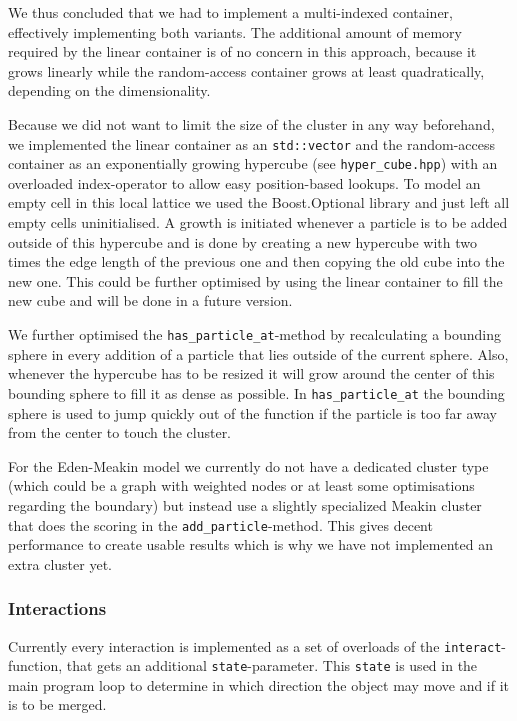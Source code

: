 \documentclass[twocolumn, 10pt]{scrartcl}
\begin{document}
                We thus concluded that we had to implement a multi-indexed container, effectively implementing both
                variants. The additional amount of memory required by the linear container is of no concern in this
                approach, because it grows linearly while the random-access container grows at least quadratically,
                depending on the dimensionality.

                Because we did not want to limit the size of the cluster in any way beforehand, we implemented the linear
                container as an \lstinline'std::vector' and the random-access container as an exponentially growing
                hypercube (see \lstinline'hyper_cube.hpp') with an overloaded index-operator to allow easy
                position-based lookups. To model an empty cell in this local lattice we used the Boost.Optional
                library\cite{src-boost} and just left all empty cells uninitialised. A growth is initiated whenever
                a particle is to be added outside of this hypercube and is done by creating a new hypercube with two
                times the edge length of the previous one and then copying the old cube into the new one. This could be
                further optimised by using the linear container to fill the new cube and will be done in a future
                version.

                We further optimised the \lstinline'has_particle_at'-method by recalculating a bounding sphere in every
                addition of a particle that lies outside of the current sphere. Also, whenever the hypercube has to be
                resized it will grow around the center of this bounding sphere to fill it as dense as possible. In
                \lstinline'has_particle_at' the bounding sphere is used to jump quickly out of the function if the
                particle is too far away from the center to touch the cluster.

                For the Eden-Meakin model we currently do not have a dedicated cluster type (which could be a graph with
                weighted nodes or at least some optimisations regarding the boundary) but instead use a slightly
                specialized Meakin cluster that does the scoring in the \lstinline'add_particle'-method. This gives
                decent performance to create usable results which is why we have not implemented an extra cluster yet.

            \subsubsection{Interactions}
                Currently every interaction is implemented as a set of overloads of the \lstinline'interact'-function,
                that gets an additional \lstinline'state'-parameter. This \lstinline'state' is used in the main program
                loop to determine in which direction the object may move and if it is to be merged.
\end{document}
